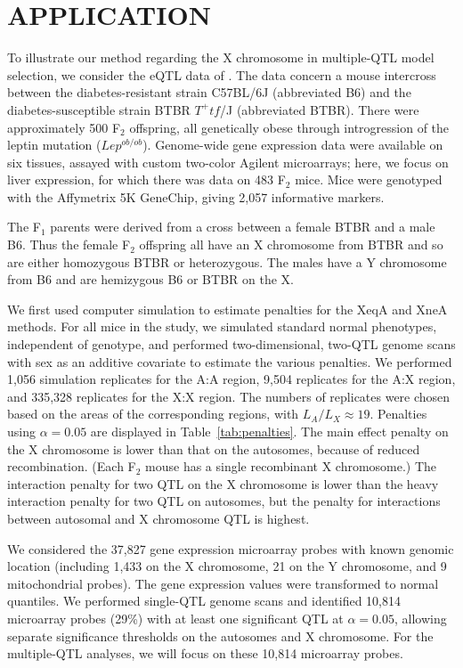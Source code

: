 \documentclass[12pt,letterpaper]{article}
\begin{document}
\clearpage
\section*{APPLICATION}

To illustrate our method regarding the X chromosome in multiple-QTL
model selection, we consider the eQTL data of \citet{Tian2016}. The
data concern a mouse intercross between the diabetes-resistant strain
C57BL/6J (abbreviated B6) and the diabetes-susceptible strain
BTBR $T^{+} tf$/J (abbreviated BTBR). There
were approximately 500 F$_2$ offspring, all genetically obese through
introgression of the leptin mutation ($Lep^{ob/ob}$). Genome-wide gene
expression data were available on six tissues, assayed with custom
two-color Agilent microarrays; here, we focus on liver expression, for
which there was data on 483 F$_2$ mice.
Mice were genotyped with the Affymetrix 5K GeneChip, giving 2,057
informative markers.

The F$_1$ parents were derived from a cross between a female BTBR and
a male B6. Thus the female F$_2$ offspring all have an X chromosome
from BTBR and so are either homozygous BTBR or heterozygous. The males
have a Y chromosome from B6 and are hemizygous B6 or BTBR on the X.

We first used computer simulation to estimate penalties for the XeqA
and XneA methods. For all mice in the study, we simulated standard
normal phenotypes, independent of genotype, and performed
two-dimensional, two-QTL genome scans with sex as an additive
covariate to estimate the various penalties. We performed 1,056
simulation replicates for the A:A region, 9,504 replicates for the A:X
region, and 335,328 replicates for the X:X region. The numbers of
replicates were chosen based on the areas of the corresponding
regions, with $L_A/L_X \approx 19$. Penalties using $\alpha=0.05$ are
displayed in Table~\ref{tab:penalties}.
The main effect penalty on the X chromosome is lower than that on
the autosomes, because of reduced recombination.
(Each F$_2$ mouse has a single recombinant X chromosome.)
The interaction
penalty for two QTL on the X chromosome is lower than the heavy
interaction penalty for two QTL on autosomes, but the
penalty for interactions between autosomal and X chromosome QTL is
highest.

We considered the 37,827 gene expression microarray probes with known
genomic location (including 1,433 on the X chromosome, 21 on the Y
chromosome, and 9 mitochondrial probes). The gene
expression values were transformed to normal quantiles. We performed single-QTL genome
scans and identified 10,814 microarray probes (29\%) with at least one
significant QTL at $\alpha=0.05$, allowing separate significance
thresholds on the autosomes and X chromosome. For the multiple-QTL
analyses, we will focus on these 10,814 microarray probes.
\end{document}
